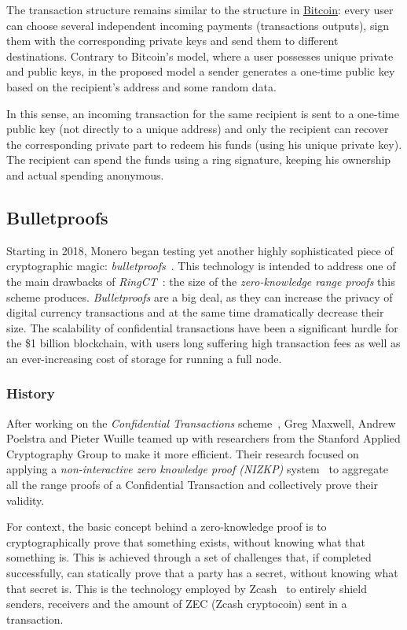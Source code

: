 The transaction structure remains similar to the structure in \hyperref[sec:Bitcoin]{Bitcoin}: every user can choose several independent incoming payments (transactions outputs), sign them with the corresponding private keys and send them to different destinations. Contrary to Bitcoin’s model, where a user possesses unique private and public keys, in the proposed model a sender generates a one-time public key based on the recipient’s address and some random data.

In this sense, an incoming transaction for the same recipient is sent to a one-time public key (not directly  to a unique  address) and only the recipient can recover the corresponding private part to redeem his funds (using his unique private key). The recipient can spend the funds using a ring signature, keeping his ownership and actual spending anonymous.
\clearpage
\pagebreak

\subsection{Bulletproofs} \label{sec:bulletproofs}
Starting in 2018, Monero began testing yet another highly sophisticated piece of cryptographic magic: \emph{bulletproofs}~\cite{bulletproofs}. This technology is intended to address one of the main drawbacks of \emph{RingCT}~\cite{ringCT}: the size of the \emph{zero-knowledge range proofs} this scheme produces. \emph{Bulletproofs} are a big deal, as they can increase the privacy of digital currency transactions and at the same time dramatically decrease their size. The scalability of confidential transactions have been a significant hurdle for the \$1 billion blockchain, with users long suffering high transaction fees as well as an ever-increasing cost of storage for running a full node.

\subsubsection{History}
After working on the \emph{Confidential Transactions} scheme~\cite{ringCT}, Greg Maxwell, Andrew Poelstra and Pieter Wuille teamed up with researchers from the Stanford Applied Cryptography Group to make it more efficient. Their research focused on applying a \emph{non-interactive zero knowledge proof (NIZKP)} system~\cite{0_knowledge} to aggregate all the range proofs of a Confidential Transaction and collectively prove their validity.

For context, the basic concept behind a zero-knowledge proof is to cryptographically prove that something exists, without knowing what that something is. This is achieved through a set of challenges that, if completed successfully, can statically prove that a party has a secret, without knowing what that secret is. This is the technology employed by Zcash~\cite{zcash} to entirely shield senders, receivers and the amount of ZEC (Zcash cryptocoin) sent in a transaction.

